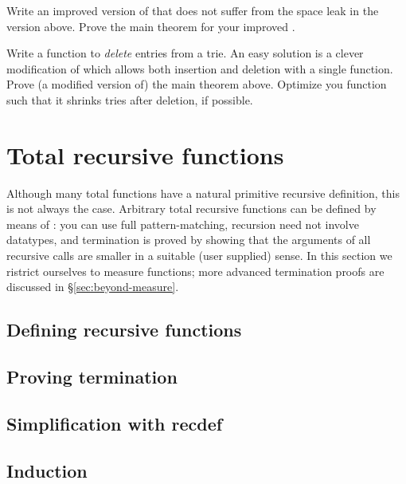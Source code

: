 \begin{exercise}
  Write an improved version of  that does not suffer from the
  space leak in the version above. Prove the main theorem for your improved
  .
\end{exercise}

\begin{exercise}
  Write a function to \emph{delete} entries from a trie. An easy solution is
  a clever modification of  which allows both insertion and
  deletion with a single function.  Prove (a modified version of) the main
  theorem above. Optimize you function such that it shrinks tries after
  deletion, if possible.
\end{exercise}

\section{Total recursive functions}
\label{sec:recdef}

Although many total functions have a natural primitive recursive definition,
this is not always the case. Arbitrary total recursive functions can be
defined by means of : you can use full pattern-matching,
recursion need not involve datatypes, and termination is proved by showing
that the arguments of all recursive calls are smaller in a suitable (user
supplied) sense. In this section we ristrict ourselves to measure functions;
more advanced termination proofs are discussed in \S\ref{sec:beyond-measure}.

\subsection{Defining recursive functions}



\subsection{Proving termination}



\subsection{Simplification with recdef}
\label{sec:recdef-simplification}



\subsection{Induction}


\label{sec:recdef-induction}

